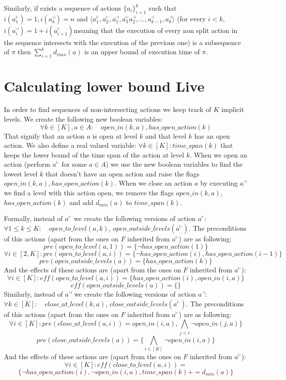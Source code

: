 \documentclass{article}
\begin{document}
Similarly, if exists a sequence of actions $\{a_i\}_{i=1}^k$ such that $i(a_1^\vdash)=1, i(a_k^\dashv)=n$ and $\langle a_1^\vdash, a_2^\vdash,a_1^\dashv, a_3^\vdash a_2^\dashv, \dots, a_{k-1}^\dashv, a_k^\dashv\rangle$ (for every $i<k$, $i(a_i^\dashv) = 1+i(a_{i+1}^\vdash)$meaning that the execution of every non split action in the sequence intersects with the execution of the previous one) is a subsequence of $\pi$ then $\sum_{i=1}^k d_{max}(a)$ is an upper bound of execution time of $\pi$.

\section{Calculating lower bound Live}

In order to find sequences of non-intersecting actions we keep track of $K$ implicit levels.
We create the following new boolean variables: 
$$
\forall k \in [K], a\in A:\quad open\_in(k, a), has\_open\_action(k)
$$
That signify that an action $a$ is open at level $k$ and that level $k$ has an open action. 
We also define a real valued variable: $\forall k \in [K]: time\_span(k)$ that keeps the lower bound of the time span of the action at level $k$.
When we open an action (perform $a^{\vdash}$ for some $a\in A$) we use the new boolean variables to find the lowest level $k$ that doesn't have an open action and raise the flags $open\_in(k, a), has\_open\_action(k)$. When we close an action $a$ by executing $a^\dashv$ we find a level with this action open, we remove the flags $open\_in(k, a)$, $has\_open\_action(k)$ and add $d_{min}(a)$ to $time\_span(k)$.

Formally, instead of $a^\vdash$ we create the following versions of action $a^\vdash$:
$\forall 1\le k\le K:\quad open\_to\_level(a, k)$, $open\_outside\_levels(a^\vdash)$.
The preconditions of this actions (apart from the ones on $F$ inherited from $a^\vdash$) are as following:
$$
pre(open\_to\_level(a, 1)) = \{\neg has\_open\_action(1)\}
$$
$$
\forall i \in [2, K]: pre(open\_to\_level(a, i)) = \{\neg has\_open\_action(i), has\_open\_action(i-1)\}
$$
$$
pre(open\_outside\_levels(a)) = \{has\_open\_action(k)\}
$$
And the effects of these actions are (apart from the ones on $F$ inherited from $a^\vdash$): 
$$
\forall i \in [K]: eff(open\_to\_level(a, i)) = \{has\_open\_action(i), open\_in(i, a)\}
$$
$$
eff(open\_outside\_levels(a)) = \{\}
$$
Similarly, instead of $a^\dashv$ we create the following versions of action $a^\dashv$:
$\forall k \in [K]:\quad close\_at\_level(k, a)$, $close\_outside\_levels(a^\vdash)$.
The preconditions of this actions (apart from the ones on $F$ inherited from $a^\vdash$) are as following:
$$
\forall i \in [K]: pre(close\_at\_level(a, i)) = open\_in(i, a),\bigwedge_{j<i}\neg open\_in(j, a)\}
$$
$$
pre(close\_outside\_levels(a)) = \{\bigwedge_{i \in [K]}\neg open\_in(i, a)\}
$$
And the effects of these actions are (apart from the ones on $F$ inherited from $a^\vdash$): 
$$
\forall i \in [K]: eff(close\_to\_level(a, i)) = 
$$
$$
\{\neg has\_open\_action(i), \neg open\_in(i, a), time\_span(k)+=d_{min}(a)\}
$$
\end{document}
